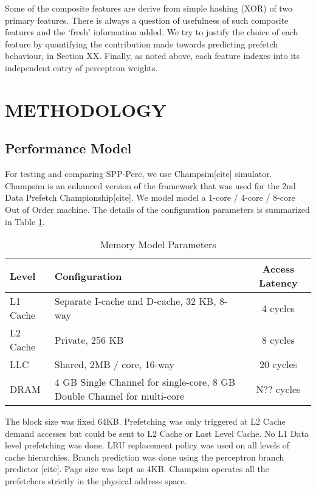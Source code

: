 \documentclass{sig-alternate}
\begin{document}
Some of the composite features are derive from simple hashing (XOR) of two primary features.
There is always a question of usefulness of such composite features and the `fresh' information added.
We try to justify the choice of each feature by quantifying the contribution made towards predicting prefetch behaviour, in Section XX.
Finally, as noted above, each feature indexes into its independent entry of perceptron weights.


\section{METHODOLOGY}
\subsection{Performance Model}
For testing and comparing SPP-Perc, we use Champsim[cite] simulator. 
Champsim is an enhanced version of the framework that was used for the 2nd Data Prefetch Championship[cite]. 
We model model a 1-core / 4-core / 8-core Out of Order machine. The details of the configuration parameters is summarized in Table  \ref{tab:Sim_params}.

\begin{table}[]
    \centering
    \begin{tabular}{|l|p{3.6cm}|c|}
    \hline
    Level & Configuration & Access Latency \\
    \hline
         L1 Cache & Separate I-cache and D-cache, 32 KB, 8-way & 4 cycles\\
         L2 Cache & Private, 256 KB & 8 cycles\\
         LLC & Shared, 2MB / core, 16-way & 20 cycles\\
         DRAM & 4 GB Single Channel for single-core, 8 GB Double Channel for multi-core & N?? cycles\\
    \hline
    \end{tabular}
    \caption{Memory Model Parameters}
    \label{tab:Sim_params}
\end{table}

The block size was fixed 64KB. Prefetching was only triggered at L2 Cache demand accesses but could be sent to L2 Cache or Last Level Cache. 
No L1 Data level prefetching was done. 
LRU replacement policy was used on all levels of cache hierarchies. 
Branch prediction was done using the perceptron branch predictor [cite]. 
Page size was kept as 4KB. 
Champsim operates all the prefetchers strictly in the physical address space.
\end{document}
